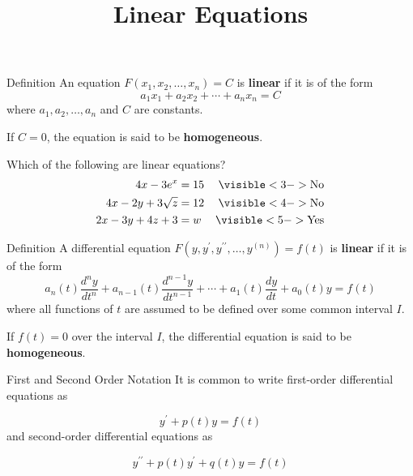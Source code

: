 \documentclass{beamer}
\title[MATH 1220 - Section 9.5]{Linear Equations}
\begin{document}
\begin{frame}
\titlepage
\end{frame}

\begin{frame}
\begin{block}{Definition}
An equation $F(x_1, x_2, \ldots, x_n)=C$ is \textbf{linear} if it is of the form
\begin{equation*}
a_1 x_1+a_2 x_2+\cdots+a_n x_n=C
\end{equation*}
where $a_1, a_2, \ldots, a_n$ and $C$ are constants.

\vspace{2mm}
If $C=0$, the equation is said to be \textbf{homogeneous}.
\end{block}\pause

\begin{example}
Which of the following are linear equations?
\begin{equation*}
\begin{aligned}
4x - 3e^x &= 15 & \visible<3->{\text{No}} \\
4x - 2y + 3\sqrt{z} &= 12 & \visible<4->{\text{No}} \\
2x - 3y +4z + 3 &= w & \visible<5->{\text{Yes}}
\end{aligned}
\end{equation*}
\end{example}
\end{frame}

\begin{frame}
\begin{block}{Definition}
A differential equation $F(y, y^\prime, y^{\prime\prime},\ldots,y^{(n)})=f(t)$ is \textbf{linear} if it is of the form
\begin{equation*}
a_n(t)\dfrac{d^n y}{dt^n}+a_{n-1}(t)\dfrac{d^{n-1} y}{dt^{n-1}}+\cdots+a_1(t)\dfrac{dy}{dt}+a_0(t)y=f(t)
\end{equation*}
where all functions of $t$ are assumed to be defined over some common interval $I$.

\vspace{2mm}
If $f(t)=0$ over the interval $I$, the differential equation is said to be \textbf{homogeneous}.
\end{block}\pause

\begin{block}{First and Second Order Notation}
It is common to write first-order differential equations as

\vspace{-3mm}
\begin{equation*}
y^\prime+p(t)y=f(t)
\end{equation*}
and second-order differential equations as

\vspace{-3mm}
\begin{equation*}
y^{\prime\prime}+p(t)y^\prime+q(t)y=f(t)
\end{equation*}
\end{block}
\end{frame}
\end{document}

